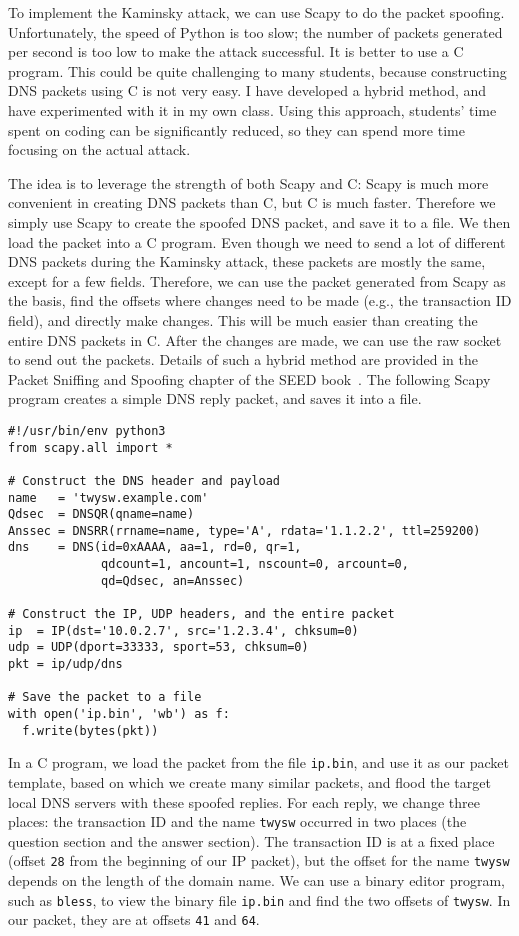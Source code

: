 To implement the Kaminsky attack, we can use Scapy to do the packet spoofing. Unfortunately,
the speed of Python is too slow; the number of packets generated per second is too low to
make the attack successful. It is better to use a C program. This could
be quite challenging to many students, because constructing DNS packets using C is not very
easy. I have developed a hybrid method, and have experimented with it in my own class. Using
this approach, students' time spent on coding can be significantly reduced, so they can spend
more time focusing on the actual attack.


The idea is to leverage the strength of both Scapy and C: Scapy is much more convenient in
creating DNS packets than C, but C is much faster. Therefore we simply
use Scapy to create the spoofed DNS packet, and save it to a file.
We then load the packet into a C program. Even though we need to send a 
lot of different DNS packets
during the Kaminsky attack, these packets are mostly the same, except for a few fields. 
Therefore, we can
use the packet generated from Scapy as the basis, find the offsets where
changes need to be made (e.g., the transaction ID field),
and directly make changes. This will be much easier than
creating the entire DNS packets in C.
After the changes are made, we can use the raw socket to send out the packets.
Details of such a hybrid method are provided in
the Packet Sniffing and Spoofing chapter 
of the SEED book~\cite{seedbook}.
The following Scapy program creates a simple DNS reply packet, 
and saves it into a file.


\begin{lstlisting}[caption={\texttt{generate\_dns\_reply.py}}]
#!/usr/bin/env python3
from scapy.all import *

# Construct the DNS header and payload
name   = 'twysw.example.com'
Qdsec  = DNSQR(qname=name)
Anssec = DNSRR(rrname=name, type='A', rdata='1.1.2.2', ttl=259200)
dns    = DNS(id=0xAAAA, aa=1, rd=0, qr=1, 
             qdcount=1, ancount=1, nscount=0, arcount=0, 
             qd=Qdsec, an=Anssec)

# Construct the IP, UDP headers, and the entire packet
ip  = IP(dst='10.0.2.7', src='1.2.3.4', chksum=0)
udp = UDP(dport=33333, sport=53, chksum=0)
pkt = ip/udp/dns

# Save the packet to a file
with open('ip.bin', 'wb') as f:
  f.write(bytes(pkt))
\end{lstlisting}

In a C program, we load the packet from the file \texttt{ip.bin}, and use
it as our packet template, based on which we create many similar packets,
and flood the target local DNS servers with these spoofed replies. For each
reply, we change three places: the transaction ID and the name
\texttt{twysw} occurred in two places (the question section and the answer
section).  The transaction ID is at a fixed place (offset  \texttt{28} from
the beginning of our IP packet), but the offset for the name \texttt{twysw}
depends on the length of the domain name. We can use a binary editor
program, such as \texttt{bless}, to view the binary file \texttt{ip.bin}
and find the two offsets of \texttt{twysw}. In our packet, they are at
offsets \texttt{41} and \texttt{64}.



